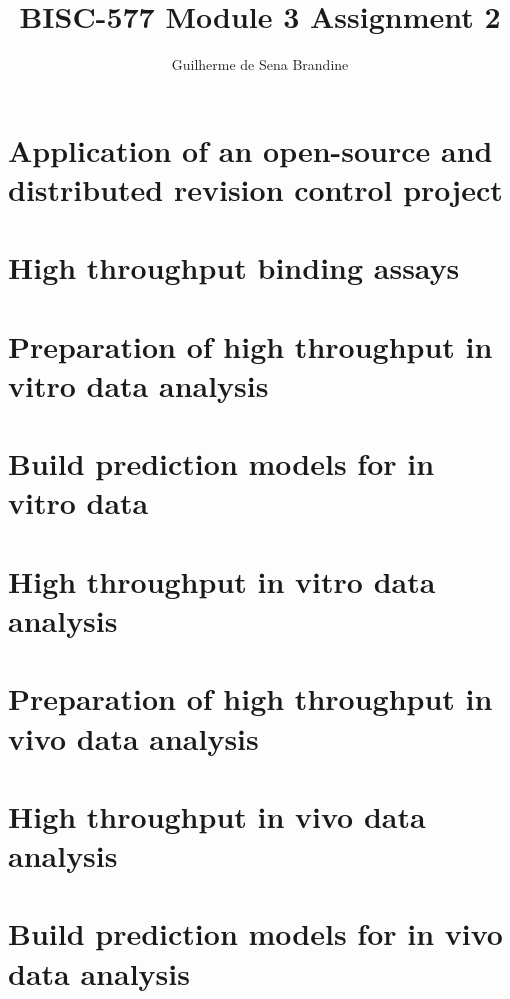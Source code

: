 \documentclass[11pt]{article}
\title{BISC-577 Module 3 Assignment 2}
\author{Guilherme de Sena Brandine}
\begin{document}
\maketitle

\section{Application of an open-source and distributed revision control project}



\section{High throughput binding assays}
\section{Preparation of high throughput in vitro data analysis}
\section{Build prediction models for in vitro data}
\section{High throughput in vitro data analysis}
\section{Preparation of high throughput in vivo data analysis}
\section{High throughput in vivo data analysis}
\section{Build prediction models for in vivo data analysis}
\end{document}
